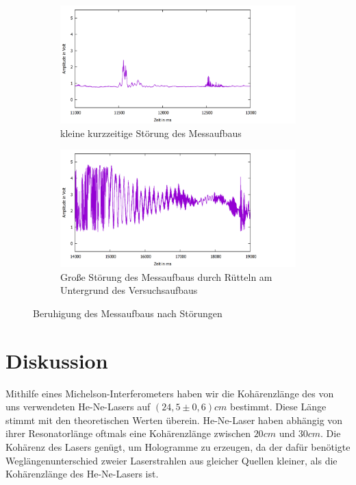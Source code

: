\documentclass[10pt,a4paper]{article}
\begin{document}
	\begin{figure}[h]
		\centering
		\begin{subfigure}{0.8\textwidth}
			\centering
			\includegraphics[width=\textwidth]{abklingzeit1.png}
			\caption{kleine kurzzeitige Störung des Messaufbaus}
			\label{bea}
		\end{subfigure}
		\begin{subfigure}{0.8\textwidth}
			\centering
			\includegraphics[width=\textwidth]{abklingzeit2.png}
			\caption{Große Störung des Messaufbaus durch Rütteln am Untergrund des Versuchsaufbaus}
			\label{beb}
		\end{subfigure}
		
		\caption{Beruhigung des Messaufbaus nach Störungen}
		\label{be1}
	\end{figure}

\section{Diskussion}

Mithilfe eines Michelson-Interferometers haben wir die Kohärenzlänge des von uns verwendeten He-Ne-Lasers auf $(24,5 \pm 0,6)cm$ bestimmt. Diese Länge stimmt mit den theoretischen Werten überein. He-Ne-Laser haben abhängig von ihrer Resonatorlänge oftmals eine Kohärenzlänge zwischen $20cm$ und $30cm$. Die Kohärenz des Lasers genügt, um Hologramme zu erzeugen, da der dafür benötigte Weglängenunterschied zweier Laserstrahlen aus gleicher Quellen kleiner, als die Kohärenzlänge des He-Ne-Lasers ist.
\end{document}
